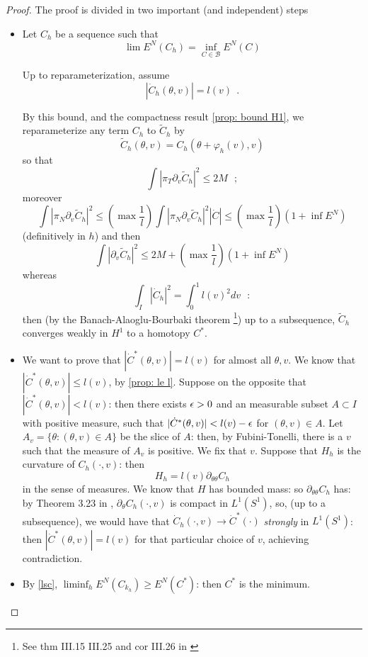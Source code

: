 \documentclass[twoside,a4paper,english]{article}
\def\derpar#1{\partial_{#1}}
\begin{document}
\begin{proof}
  The proof is divided in two important (and independent) steps
  \begin{itemize}
  \item 
    Let $C_h$ be a sequence such that
    \[ \lim E^N(C_h) = \inf_{C\in \mathcal B} E^N(C)\]

    Up to reparameterization, assume
     \[ |\dot C_h(\theta,v)|=l(v) ~~. \]


    By this bound, and the compactness result \ref{prop: bound H1},
    we reparameterize any term $C_h$ to $\widetilde C_h$ by
    \[ \widetilde C_h(\theta,v) =C_h(\theta+\varphi_h(v),v)\]
    so that 
    \[ \int |\pi_T \derpar v \widetilde C_h|^2 \le 2M ~~~;\]
    moreover 
    \begin{equation}
      \int |\pi_N \derpar v \widetilde C_h|^2 \le
      (\max \frac 1{l})\int |\pi_N \derpar v \widetilde C_h|^2 |\dot C|\le
      (\max \frac 1{l})  (1+ \inf E^N) 
      \label{eq:acci} 
    \end{equation}
    (definitively in $h$) and then 
    \[ \int | \derpar v \widetilde C_h|^2 \le 2M+ 
    (\max \frac 1{l})   (1+\inf E^N) \]
    whereas
    \[ \int_I |\dot C_h|^2 = \int_0^1 l(v) ^2 dv~~~:\]
    then (by the Banach-Alaoglu-Bourbaki theorem
    \footnote{See thm III.15 III.25 and cor III.26 in \cite{Brezis}})
    up to a subsequence,  $\widetilde C_{h}$ converges
    weakly in $H^1$ to a homotopy $C^*$. 

  \item 
    We want to prove that 
    $|\dot C^*(\theta,v)|=l(v)$ for almost all $\theta,v$.
    We know that $|\dot C^*(\theta,v)|\le l(v)$,
    by \ref{prop: le l}. Suppose on the opposite that 
    $|\dot C^*(\theta,v)|<l(v)$: then there exists $\epsilon>0$ and
    an measurable subset $A\subset I$ with positive measure, such that    
    $|\dot C^*(\theta,v)|<l(v)-\epsilon$ for $(\theta,v)\in A$. 
    Let $A_v=\{ \theta : (\theta,v)\in A\}$ be the slice of $A$:
    then, by Fubini-Tonelli, there is a $v$ such that the measure
    of $A_v$ is positive. We fix that $v$. Suppose that $H_h$
    is the curvature of $C_h(\cdot,v)$: then 
    \[ H_h = l(v) \derpar{\theta\theta} C_h \]
    in the sense of measures.
    We know that $H$ has bounded mass: so $\derpar{\theta\theta} C_h$ has:
    by Theorem 3.23 in \cite{AFP:BV}, $\derpar{\theta} C_h(\cdot,v)$
    is compact in $L^1(S^1)$, so,   (up to a
    subsequence), we would have that $\dot C_{h}(\cdot,v) \to \dot
    C^*(\cdot)$ \emph{strongly} in $L^1(S^1)$:
    then $|\dot C^*(\theta,v)|=l(v)$ for that particular choice of $v$,
    achieving contradiction.
  \item 
    By \ref{lsc},
    $\liminf_h E^N (C_{k_h}) \ge E^N(C^*)$: then $C^*$ is the minimum.
\end{itemize}
\end{proof}
\end{document}
